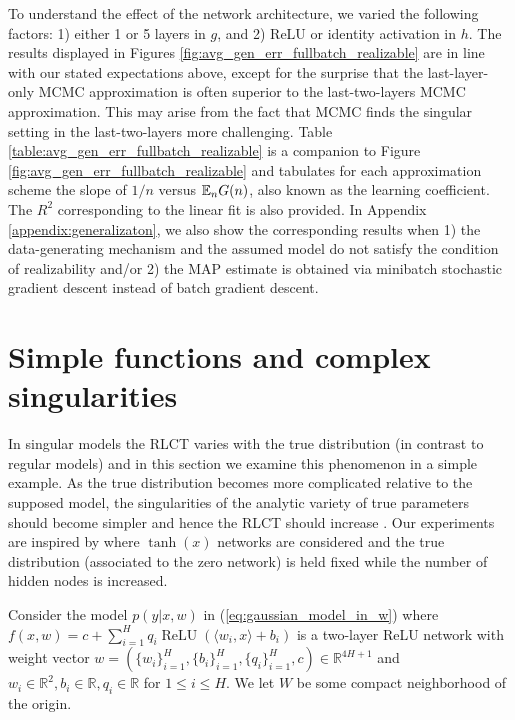 \documentclass{article} %
\begin{document}
To understand the effect of the network architecture, we varied the following factors:  1) either 1 or 5 layers in $g$, and 2) ReLU or identity activation in $h$.
The results displayed in Figures \ref{fig:avg_gen_err_fullbatch_realizable} are in line with our stated expectations above, except for the surprise that the last-layer-only MCMC approximation is often superior to the last-two-layers MCMC approximation. This may arise from the fact that MCMC finds the singular setting in the last-two-layers more challenging. Table \ref{table:avg_gen_err_fullbatch_realizable} is a companion to Figure \ref{fig:avg_gen_err_fullbatch_realizable} and tabulates for each approximation scheme the slope of $1/n$ versus ${\mathbb{E}}_n G(n)$, also known as the learning coefficient. The $R^2$ corresponding to the linear fit is also provided. 
In Appendix \ref{appendix:generalizaton}, we also show the corresponding results when 1) the data-generating mechanism and the assumed model do not satisfy the condition of realizability and/or 2) the MAP estimate is obtained via minibatch stochastic gradient descent instead of batch gradient descent. 



\section{Simple functions and complex singularities}\label{section:simple_func}

In singular models the RLCT varies with the true distribution (in contrast to regular models) and in this section we examine this phenomenon in a simple example. As the true distribution becomes more complicated relative to the supposed model, the singularities of the analytic variety of true parameters should become simpler and hence the RLCT should increase \citep[\S 7.6]{watanabe_algebraic_2009}. Our experiments are inspired by \citep[\S 7.2]{watanabe_algebraic_2009} where $\operatorname{tanh}(x)$ networks are considered and the true distribution (associated to the zero network) is held fixed while the number of hidden nodes is increased.

Consider the model $p(y|x,w)$ in (\ref{eq:gaussian_model_in_w}) where
$
f(x,w) = c + \sum_{i=1}^H q_i \operatorname{ReLU}( \langle w_i, x \rangle + b_i )
$
is a two-layer ReLU network with weight vector $w = (\{w_i\}_{i=1}^H, \{b_i\}_{i=1}^H, \{q_i\}_{i=1}^H, c) \in \mathbb{R}^{4H+1}$ and $w_i \in \mathbb{R}^2, b_i \in \mathbb{R}, q_i \in \mathbb{R}$ for $1 \le i \le H$. We let $W$ be some compact neighborhood of the origin.
\end{document}
